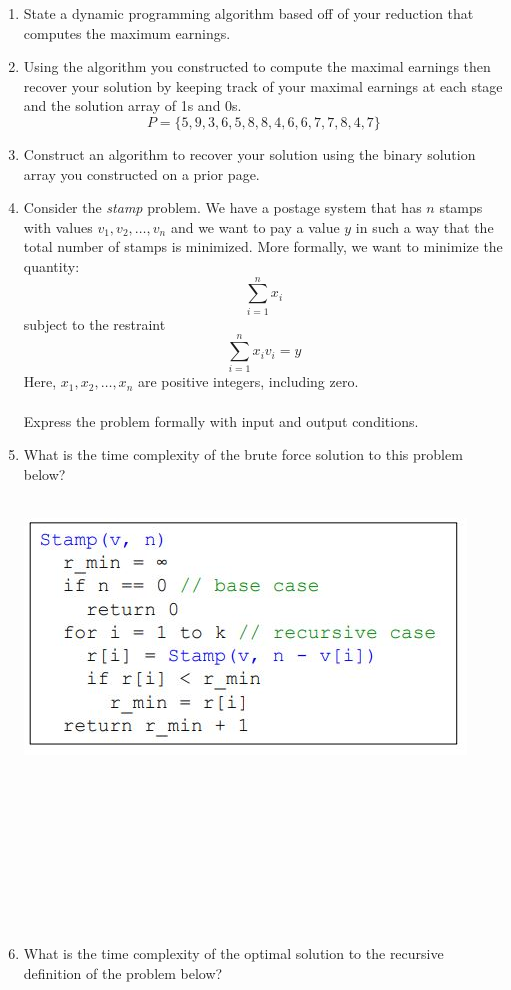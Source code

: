 \documentclass[12pt]{article}
\begin{document}
\begin{enumerate}
\item State a dynamic programming algorithm based off of your reduction that computes the maximum earnings.
\newpage
\item Using the algorithm you constructed to compute the maximal earnings then recover your solution by keeping track of your maximal earnings at each stage and the solution array of 1s and 0s.
$$P=\{5, 9, 3, 6, 5, 8, 8, 4, 6, 6, 7, 7, 8, 4, 7\}$$
\newpage
\item Construct an algorithm to recover your solution using the binary solution array you constructed on a prior page.
\newpage 
\item Consider the \textit{stamp} problem. We have a postage system that has $n$ stamps with values 
$v_1,v_2,\dots,v_n$ and we want to pay a value $y$ in such a way that the total number of stamps is 
minimized. More formally, we want to minimize the quantity:
$$\sum\limits_{i=1}^{n}{x_i}$$
subject to the restraint
$$\sum\limits_{i=1}^{n}{x_{i}v_{i}} = y$$
Here, $x_1,x_2,\dots,x_n$ are positive integers, including zero.\\\\
Express the problem formally with input and output conditions.
\newpage
\item What is the time complexity of the brute force solution to this problem below?\\\\
\centerline{\includegraphics{stamp.jpg}}
\\\\\\\\\\\\\\\\
\item What is the time complexity of the optimal solution to the recursive definition of the problem below?\\\\

\end{enumerate}
\end{document}
